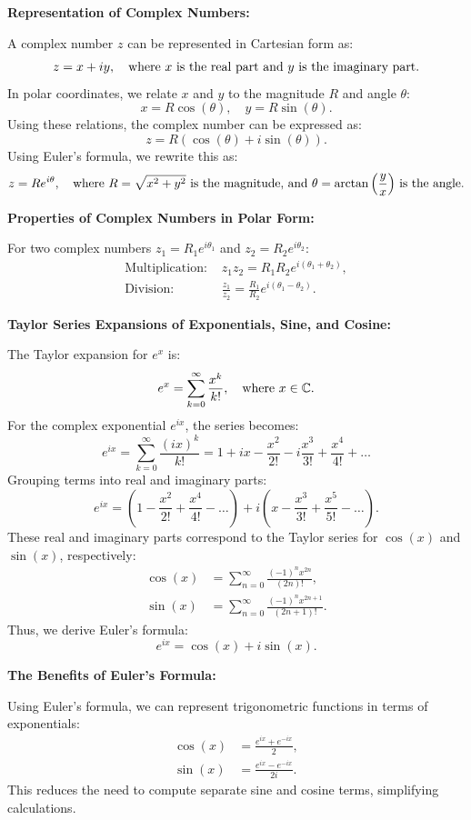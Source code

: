 \documentclass{article}
\begin{document}
\begin{itemize}
{\textbf{Representation of Complex Numbers:}

A complex number \( z \) can be represented in Cartesian form as:
\[ z = x + iy, \quad \text{where \( x \) is the real part and \( y \) is the imaginary part.} \]
In polar coordinates, we relate \( x \) and \( y \) to the magnitude \( R \) and angle \( \theta \):
\[ x = R \cos(\theta), \quad y = R \sin(\theta). \]
Using these relations, the complex number can be expressed as:
\[ z = R (\cos(\theta) + i \sin(\theta)). \]
Using Euler's formula, we rewrite this as:
\[ z = R e^{i\theta}, \quad \text{where \( R = \sqrt{x^2 + y^2} \) is the magnitude, and \( \theta = \arctan\left(\frac{y}{x}\right) \) is the angle.} \]

\textbf{Properties of Complex Numbers in Polar Form:}

For two complex numbers \( z_1 = R_1 e^{i\theta_1} \) and \( z_2 = R_2 e^{i\theta_2} \):
\begin{align*}
\text{Multiplication: } & z_1 z_2 = R_1 R_2 e^{i(\theta_1 + \theta_2)}, \\
\text{Division: } & \frac{z_1}{z_2} = \frac{R_1}{R_2} e^{i(\theta_1 - \theta_2)}.
\end{align*}

\textbf{Taylor Series Expansions of Exponentials, Sine, and Cosine:}

The Taylor expansion for \( e^x \) is:
\[ e^x = \sum_{k=0}^\infty \frac{x^k}{k!}, \quad \text{where \( x \in \mathbb{C} \)}. \]
For the complex exponential \( e^{ix} \), the series becomes:
\[ e^{ix} = \sum_{k=0}^\infty \frac{(ix)^k}{k!} = 1 + ix - \frac{x^2}{2!} - i\frac{x^3}{3!} + \frac{x^4}{4!} + \dots \]
Grouping terms into real and imaginary parts:
\[ e^{ix} = \left( 1 - \frac{x^2}{2!} + \frac{x^4}{4!} - \dots \right) + i \left( x - \frac{x^3}{3!} + \frac{x^5}{5!} - \dots \right). \]
These real and imaginary parts correspond to the Taylor series for \( \cos(x) \) and \( \sin(x) \), respectively:
\begin{align*}
\cos(x) &= \sum_{n=0}^\infty \frac{(-1)^n x^{2n}}{(2n)!}, \\
\sin(x) &= \sum_{n=0}^\infty \frac{(-1)^n x^{2n+1}}{(2n+1)!}.
\end{align*}
Thus, we derive Euler's formula:
\[ e^{ix} = \cos(x) + i \sin(x). \]

\textbf{The Benefits of Euler's Formula:}

Using Euler's formula, we can represent trigonometric functions in terms of exponentials:
\begin{align*}
\cos(x) &= \frac{e^{ix} + e^{-ix}}{2}, \\
\sin(x) &= \frac{e^{ix} - e^{-ix}}{2i}.
\end{align*}
This reduces the need to compute separate sine and cosine terms, simplifying calculations.

}
\end{itemize}
\end{document}
